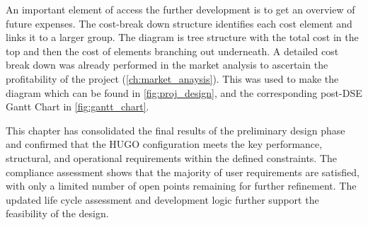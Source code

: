 An important element of access the further development is to get an overview of future expenses. 
The cost-break down structure identifies each cost element and links it to a larger group. The diagram is tree structure with the total cost in the top and then the cost of elements branching out underneath. A detailed cost break down was already performed in the market analysis to ascertain the profitability of the project (\autoref{ch:market_anaysis}). This was used to make the diagram which can be found in \autoref{fig:proj_design}, and the corresponding post-DSE Gantt Chart in \autoref{fig:gantt_chart}.

This chapter has consolidated the final results of the preliminary design phase and confirmed that the HUGO configuration meets the key performance, structural, and operational requirements within the defined constraints. The compliance assessment shows that the majority of user requirements are satisfied, with only a limited number of open points remaining for further refinement. The updated life cycle assessment and development logic further support the feasibility of the design. 




